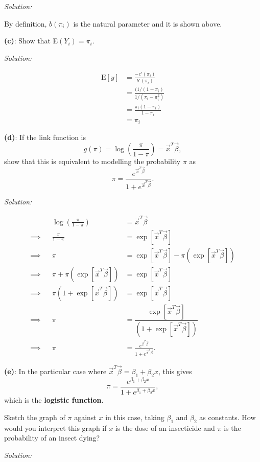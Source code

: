 \documentclass[]{article}
\begin{document}
\emph{Solution: }

By definition, \(b(\pi_i)\) is the natural parameter and it is shown
above.

\textbf{(c)}: Show that E\((Y_i) = \pi_i\).

\emph{Solution: }

\begin{align*}
\text{E}[y] &= \frac{-c'(\pi_i)}{b'(\pi_i)}\\
            &= \frac{(1/(1-\pi_i)}{1/(\pi_i-\pi_i^2)}\\
            &= \frac{\pi_i(1-\pi_i)}{1-\pi_i}\\
            &= \pi_i
\end{align*}

\textbf{(d)}: If the link function is
\[g(\pi) = \log\left( \frac{\pi}{1-\pi} \right) = \vec{x}^T\vec{\beta},\]
show that this is equivalent to modelling the probability \(\pi\) as
\[\pi = \frac{e^{\vec{x}^T\vec{\beta}}}{1 + e^{\vec{x}^T\vec{\beta}}}.\]

\emph{Solution: }

\begin{align*}
& & \log\left( \frac{\pi}{1-\pi} \right) &= \vec{x}^T\vec{\beta}\\
\implies & & \frac{\pi}{1-\pi} &= \exp[\vec{x}^T\vec{\beta}]\\
\implies & & \pi &= \exp[\vec{x}^T\vec{\beta}] - \pi(\exp[\vec{x}^T\vec{\beta}])\\
\implies & & \pi + \pi(\exp[\vec{x}^T\vec{\beta}]) &= \exp[\vec{x}^T\vec{\beta}]\\
\implies & & \pi(1 + \exp[\vec{x}^T\vec{\beta}]) &= \exp[\vec{x}^T\vec{\beta}]\\
\implies & & \pi &= \dfrac{\exp[\vec{x}^T\vec{\beta}]}{(1 + \exp[\vec{x}^T\vec{\beta}])}\\
\implies & & \pi &= \frac{e^{\vec{x}^T\vec{\beta}}}{1 + e^{\vec{x}^T\vec{\beta}}}.
\end{align*}

\textbf{(e)}: In the particular case where
\(\vec{x}^T\vec{\beta} = \beta_1 + \beta_2x\), this gives
\[\pi = \frac{e^{\beta_1 + \beta_2x}}{1 + e^{\beta_1 + \beta_2x}},\]
which is the \textbf{logistic function}.

Sketch the graph of \(\pi\) against \(x\) in this case, taking
\(\beta_1\) and \(\beta_2\) as constants. How would you interpret this
graph if \(x\) is the dose of an insecticide and \(\pi\) is the
probability of an insect dying?

\emph{Solution: }
\end{document}
